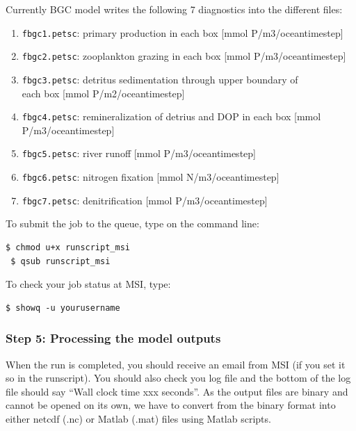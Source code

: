 \documentclass[a4paper]{article}
\def\noin{\noindent }
\begin{document}
\noin Currently BGC model writes the following 7 diagnostics into the different files:
\begin{enumerate}
\item \verb|fbgc1.petsc|: primary production in each box [mmol P/m3/oceantimestep]
\item \verb|fbgc2.petsc|: zooplankton grazing in each box [mmol P/m3/oceantimestep]
\item \verb|fbgc3.petsc|: detritus sedimentation through upper boundary of \\ each box [mmol P/m2/oceantimestep]
\item \verb|fbgc4.petsc|: remineralization of detrius and DOP in each box [mmol P/m3/oceantimestep]
\item \verb|fbgc5.petsc|: river runoff [mmol P/m3/oceantimestep]
\item \verb|fbgc6.petsc|: nitrogen fixation [mmol N/m3/oceantimestep]
\item \verb|fbgc7.petsc|: denitrification [mmol P/m3/oceantimestep]
\end{enumerate}

\noin To submit the job to the queue, type on the command line:
\begin{lstlisting}[style=DOS]
 $ chmod u+x runscript_msi
 $ qsub runscript_msi
\end{lstlisting}

\noin To check your job status at MSI, type:
\begin{lstlisting}[style=DOS]
 $ showq -u yourusername
\end{lstlisting}

\subsubsection{Step 5: Processing the model outputs}

\noin When the run is completed, you should receive an email from MSI (if you set it so in the runscript). You should also check you log file and the bottom of the log file should say ``Wall clock time xxx seconds''. As the output files are binary and cannot be opened on its own, we have to convert from the binary format into either netcdf (.nc) or Matlab (.mat) files using Matlab scripts.
\end{document}
